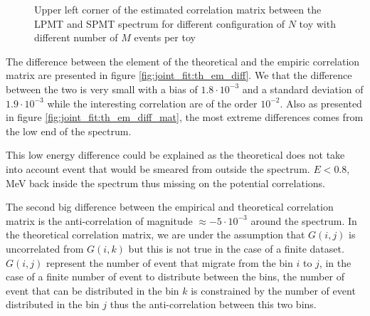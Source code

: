 \documentclass[../main.tex]{subfiles}
\begin{document}
\begin{figure}[ht]
\begin{subfigure}[t]{0.33\linewidth}
    \caption{}
    \label{fig:joint_fit:empirical_cor:cheff_kiss}
  \end{subfigure}
  \caption{Upper left corner of the estimated correlation matrix between the LPMT and SPMT spectrum for different configuration of $N$ toy with different number of $M$ events per toy}
  \label{fig:joint_fit:empirical_cor}
\end{figure}


The difference between the element of the theoretical and the empiric correlation matrix are presented in figure \ref{fig:joint_fit:th_em_diff}. We that the difference between the two is very small with a bias of $1.8 \cdot 10^{-3}$ and a standard deviation of $1.9 \cdot 10^{-3}$ while the interesting correlation are of the order $10^{-2}$. Also as presented in figure \ref{fig:joint_fit:th_em_diff_mat}, the most extreme differences comes from the low end of the spectrum.

This low energy difference could be explained as the theoretical does not take into account event that would be smeared from outside the spectrum. $E < 0.8$, MeV back inside the spectrum thus missing on the potential correlations.

The second big difference between the empirical and theoretical correlation matrix is the anti-correlation of magnitude $\approx -5\cdot 10^{-3}$ around the spectrum. In the theoretical correlation matrix, we are under the assumption that $G(i, j)$ is uncorrelated from $G(i, k)$ but this is not true in the case of a finite dataset. $G(i, j)$ represent the number of event that migrate from the bin $i$ to $j$, in the case of a finite number of event to distribute between the bins, the number of event that can be distributed in the bin $k$ is constrained by the number of event distributed in the bin $j$ thus the anti-correlation between this two bins.
\end{document}
